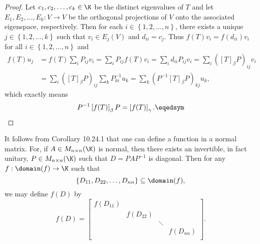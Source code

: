 \documentclass[linearalgebra]{subfiles}
\begin{document}
    \begin{proof}
        Let $c_1,c_2,\ldots,c_k\in\K$ be the distinct eigenvalues of $T$ and let $E_1,E_2,\ldots,E_k:V\to V$ be the orthogonal projections of $V$ onto the associated eigenspace, respectively. Then for each $i\in\left\lbrace 1,2,\ldots,n \right\rbrace$, there exists a unique $j\in\left\lbrace 1,2,\ldots,k \right\rbrace$ such that $v_i\in E_j(V)$ and $d_{ii} = c_j$. Thus $f(T)v_i = f\left( d_{ii} \right) v_i$ for all $i\in\left\lbrace 1,2,\ldots,n \right\rbrace$ and
        \begin{align*}
            f(T)u_j & = f(T)\sum^{}_{i} P_{ij}v_i = \sum^{}_{i} P_{ij}f(T)v_i = \sum^{}_{i} d_{ii}P_{ij}v_i = \sum^{}_{i} \left( \left[ T \right] _\beta P \right) _{ij}v_i \\
                    & = \sum^{}_{i} \left( \left[ T \right] _\beta P \right)_{ij} \sum^{}_{k} P^{-1}_{ki}u_k = \sum^{}_{k} \left( P^{-1}\left[ T \right] _\beta P \right) _{kj}u_k,
        \end{align*} 
        which exactly means
        \begin{equation*}
            P^{-1}\left[ f(T) \right] _\beta P = \left[ f(T) \right] _\gamma. \eqedsym
        \end{equation*}
    \end{proof}

    \begin{remark}
        It follows from Corollary 10.24.1 that one can define a function in a normal matrix. For, if $A\in M_{n\times n}(\K)$ is normal, then there exists an invertible, in fact unitary, $P\in M_{n\times n}(\K)$ such that $D = PAP^{-1}$ is diagonal. Then for any $f:\domain(f)\to\K$ such that
        \begin{equation*}
            \left\lbrace D_{11},D_{22},\ldots,D_{nn} \right\rbrace \subseteq\domain(f),
        \end{equation*}
        we may define $f(D)$ by
        \begin{equation*}
            f(D) = 
            \begin{bmatrix}
                f\left( D_{11} \right) & & & \\
                & f\left( D_{22} \right) & & \\
                & & \ddots& \\
                & & & f\left( D_{nn} \right) \\
            \end{bmatrix}.
        \end{equation*}
    \end{remark}
\end{document}
